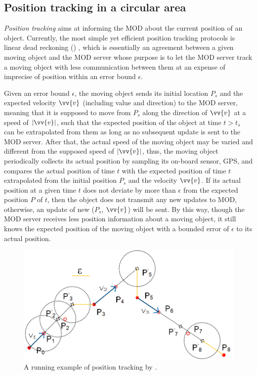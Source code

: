 \subsection{Position tracking in a circular area}

\textit{Position tracking} aims at informing the MOD about the current position of an object. Currently, the most simple yet efficient position tracking protocols is linear dead reckoning (\ldr) \cite{ Wolfson:PositionTracking}, which is essentially an agreement between a given moving object and the MOD server whose purpose is to let the MOD server track a moving object with less communication between them at an expense of imprecise of position within an error bound $\epsilon$.  

Given an error bound $\epsilon$, the moving object sends its initial location $P_s$ and the expected velocity $\vv{v}$
(including value and direction) to the MOD server, meaning that it is supposed to move from $P_s$ along the direction of $\vv{v}$ at a speed of $|\vv{v}|$, such that the expected position of the object at time $t>t_s$ can be extrapolated from them as long as no subsequent update is sent to the MOD server. 
After that, the actual speed of the moving object may be varied and different from the supposed speed of $|\vv{v}|$, thus, the moving object periodically collects its actual position by sampling its on-board sensor, \eg GPS, and compares the actual position of time $t$ with the expected position of time $t$ extrapolated from the initial position $P_s$ and the velocity $\vv{v}$. If its actual position at a given time $t$ does not deviate by more than $\epsilon$ from the expected position $P$ of $t$, then the object does not transmit any new updates to MOD, otherwise, an update of new ($P_s$, $\vv{v}$) will be sent.
%
By this way, though the MOD server receives less position information about a moving object, it still knows the expected position of the moving object with a bounded error of $\epsilon$ to its actual position.

\begin{figure}[tb!]
	\centering
	\includegraphics[scale=0.9]{figures/Fig-LDR.png}
	\vspace{-1ex}
	\caption{\small A running example of position tracking by \ldr. }
	\vspace{-1.5ex}
	\label{fig:ldr}
\end{figure}

